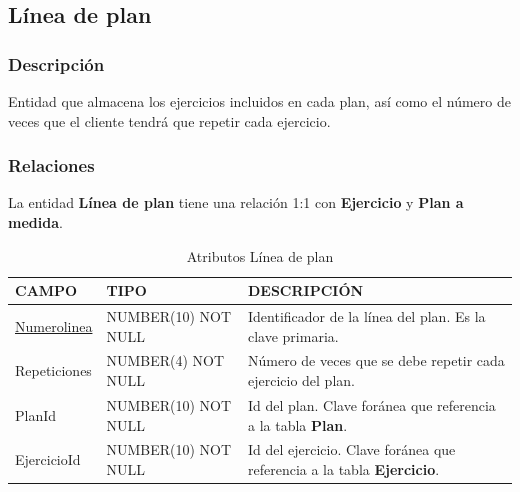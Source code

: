 \documentclass[12pt, a4paper]{article}
\begin{document}
	\subsection{Línea de plan}
	\subsubsection*{Descripción}
	Entidad que almacena los ejercicios incluidos en cada plan, así como el número de veces que el cliente tendrá que repetir cada ejercicio.
	\subsubsection*{Relaciones}
	La entidad \textbf{Línea de plan} tiene una relación 1:1 con \textbf{Ejercicio} y \textbf{Plan a medida}.
	\begin{table}[H]
		\centering
		\caption{Atributos Línea de plan}
		\begin{tabular}{@{} m{2.5cm} m{5.5cm} m{7cm} @{}}
			\toprule
			\textbf{CAMPO} & \textbf{TIPO} & \textbf{DESCRIPCIÓN} \\ \midrule
			\underline{Numero\textunderscore linea} & NUMBER(10) NOT NULL & Identificador de la línea del plan. Es la clave primaria. \\
			Repeticiones & NUMBER(4) NOT NULL & Número de veces que se debe repetir cada ejercicio del plan. \\
			Plan\textunderscore Id & NUMBER(10) NOT NULL & Id del plan. Clave foránea que referencia a la tabla \textbf{Plan}. \\
			Ejercicio\textunderscore Id & NUMBER(10) NOT NULL & Id del ejercicio. Clave foránea que referencia a la tabla \textbf{Ejercicio}. \\ \bottomrule
		\end{tabular}
	\end{table}
\end{document}

